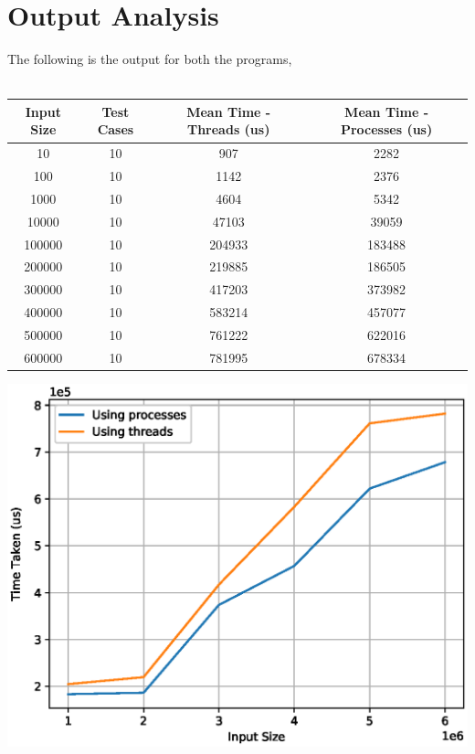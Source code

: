 \documentclass[a4paper,12pt]{report}
\begin{document}
\section*{Output Analysis}
The following is the output for both the programs,\\\\
\begin{tabular}{|c|c|c|c|}
\hline
Input Size & Test Cases       & Mean Time - Threads (us)          & Mean Time - Processes (us) \\ \hline
10         & \cellcolor[HTML]{FFFFFF}10 & \cellcolor[HTML]{FFFFFF}907  & 2282                  \\ \hline
100        & \cellcolor[HTML]{FFFFFF}10 & \cellcolor[HTML]{FFFFFF}1142 & 2376                  \\ \hline
1000       & 10                         & 4604                         & 5342                  \\ \hline
10000      & 10                         & 47103                        & 39059                 \\ \hline
100000     & 10                         & 204933                       & 183488                \\ \hline
200000     & 10                         & 219885                       & 186505                \\ \hline
300000     & 10                         & 417203                       & 373982                \\ \hline
400000     & 10                         & 583214                       & 457077                \\ \hline
500000     & 10                         & 761222                       & 622016                \\ \hline
600000     & 10                         & 781995                       & 678334                \\ \hline
\end{tabular}
\begin{center}
\includegraphics{process_vs_thread.eps}
\end{center}
\end{document}
